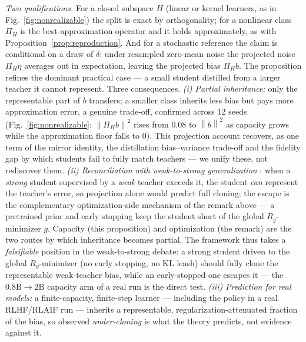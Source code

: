 \documentclass[10pt]{article} %
\theoremstyle{plain}
\theoremstyle{remark}
\newcommand{\norm}[1]{\left\lVert #1 \right\rVert}
\begin{document}
\noindent \emph{Two qualifications.} For a closed subspace $H$ (linear or kernel learners, as in Fig.~\ref{fig:nonrealizable}) the split is exact by orthogonality; for a nonlinear class $\Pi_H$ is the best-approximation operator and it holds approximately, as with Proposition~\ref{prop:reproduction}. And for a stochastic reference the claim is conditional on a draw of $\delta$: under resampled zero-mean noise the projected noise $\Pi_H\eta$ averages out in expectation, leaving the projected bias $\Pi_H b$. The proposition refines the dominant practical case --- a small student distilled from a larger teacher it cannot represent. Three consequences. \emph{(i) Partial inheritance:} only the representable part of $b$ transfers; a smaller class inherits less bias but pays more approximation error, a genuine trade-off, confirmed across $12$ seeds (Fig.~\ref{fig:nonrealizable}: $\norm{\Pi_H b}^2$ rises from $0.08$ to $\norm{b}^2$ as capacity grows while the approximation floor falls to $0$). This projection account recovers, as one term of the mirror identity, the distillation bias--variance trade-off \citep{menon2021} and the fidelity gap by which students fail to fully match teachers \citep{stanton2021} --- we unify these, not rediscover them. \emph{(ii) Reconciliation with weak-to-strong generalization} \citep{burns2023}: when a \emph{strong} student supervised by a \emph{weak} teacher exceeds it, the student \emph{can} represent the teacher's error, so projection alone would predict full cloning; the escape is the complementary optimization-side mechanism of the remark above --- a pretrained prior and early stopping keep the student short of the global $R_g$-minimizer $g$. Capacity (this proposition) and optimization (the remark) are the two routes by which inheritance becomes partial. The framework thus takes a \emph{falsifiable} position in the weak-to-strong debate: a strong student driven to the global $R_g$-minimizer (no early stopping, no KL leash) should fully clone the representable weak-teacher bias, while an early-stopped one escapes it --- the $0.8\mathrm{B}\!\to\!2\mathrm{B}$ capacity arm of a real run is the direct test. \emph{(iii) Prediction for real models:} a finite-capacity, finite-step learner --- including the policy in a real RLHF/RLAIF run --- inherits a representable, regularization-attenuated fraction of the bias, so observed \emph{under-cloning} is what the theory predicts, not evidence against it.
\end{document}

